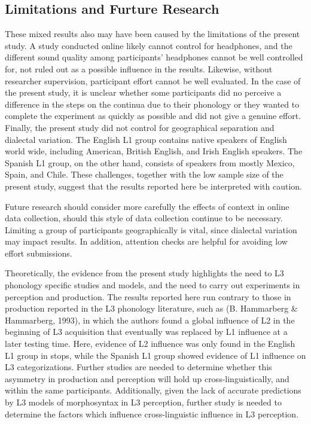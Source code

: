 \documentclass[
  english,
  man]{apa6}
\begin{document}
\hypertarget{limitations-and-furture-research}{%
\subsection{Limitations and Furture Research}\label{limitations-and-furture-research}}

These mixed results also may have been caused by the limitations of the present study. A study conducted online likely cannot control for headphones, and the different sound quality among participants' headphones cannot be well controlled for, not ruled out as a possible influence in the results. Likewise, without researcher supervision, participant effort cannot be well evaluated. In the case of the present study, it is unclear whether some participants did no perceive a difference in the steps on the continua due to their phonology or they wanted to complete the experiment as quickly as possible and did not give a genuine effort. Finally, the present study did not control for geographical separation and dialectal variation. The English L1 group contains native speakers of English world wide, including American, British English, and Irish English speakers. The Spanish L1 group, on the other hand, consists of speakers from mostly Mexico, Spain, and Chile. These challenges, together with the low sample size of the present study, suggest that the results reported here be interpreted with caution.

Future research should consider more carefully the effects of context in online data collection, should this style of data collection continue to be necessary. Limiting a group of participants geographically is vital, since dialectal variation may impact results. In addition, attention checks are helpful for avoiding low effort submissions.

Theoretically, the evidence from the present study highlights the need to L3 phonology specific studies and models, and the need to carry out experiments in perception and production. The results reported here run contrary to those in production reported in the L3 phonology literature, such as (B. Hammarberg \& Hammarberg, 1993), in which the authors found a global influence of L2 in the beginning of L3 acquisition that eventually was replaced by L1 influence at a later testing time.
Here, evidence of L2 influence was only found in the English L1 group in stops, while the Spanish L1 group showed evidence of L1 influence on L3 categorizations.
Further studies are needed to determine whether this asymmetry in production and perception will hold up cross-linguistically, and within the same participants.
Additionally, given the lack of accurate predictions by L3 models of morphosyntax in L3 perception, further study is needed to determine the factors which influence cross-linguistic influence in L3 perception.
\end{document}
